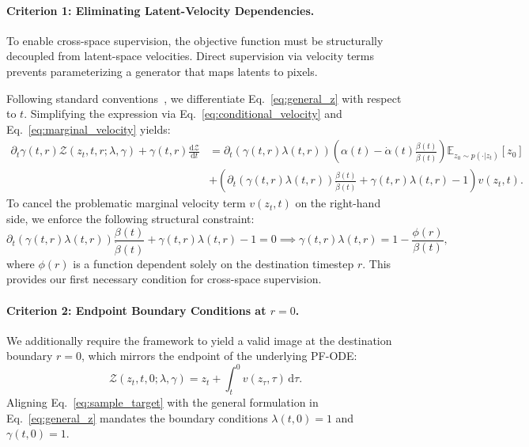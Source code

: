 \paragraph{Criterion 1: Eliminating Latent-Velocity Dependencies.}
To enable cross-space supervision, the objective function must be structurally decoupled from latent-space velocities. Direct supervision via velocity terms prevents parameterizing a generator that maps latents to pixels. 

Following standard conventions~\citep{meanflow}, we differentiate Eq.~\eqref{eq:general_z} with respect to $t$. Simplifying the expression via Eq.~\eqref{eq:conditional_velocity} and Eq.~\eqref{eq:marginal_velocity} yields:
\begin{equation}
\begin{aligned}
\partial_t\gamma(t,r)\mathcal{Z}(z_t, t, r; \lambda, \gamma) + \gamma(t,r)\frac{\mathrm{d}\mathcal{Z}}{\mathrm{d}t} 
&= \partial_t (\gamma(t, r) \lambda(t, r))\left(\alpha(t)-\dot{\alpha}(t)\frac{\beta(t)}{\dot{\beta}(t)}\right)\mathbb{E}_{z_0\sim p(\cdot | z_t)}[z_0] \\
&+\left(\partial_t (\gamma(t, r) \lambda(t, r))\frac{\beta(t)}{\dot{\beta}(t)}+\gamma(t, r) \lambda(t, r)-1\right)v(z_t,t).
\end{aligned}
\label{eq:z_derivative}
\end{equation}
To cancel the problematic marginal velocity term $v(z_t, t)$ on the right-hand side, we enforce the following structural constraint:
\begin{equation}
\partial_t(\gamma(t, r) \lambda(t, r))\frac{\beta(t)}{\dot{\beta}(t)}+\gamma(t, r) \lambda(t, r)-1 = 0 \implies \gamma(t,r)\lambda(t, r)=1-\frac{\phi(r)}{\beta(t)},
\label{eq:cancel_v}
\end{equation}
where $\phi(r)$ is a function dependent solely on the destination timestep $r$. This provides our first necessary condition for cross-space supervision.

\paragraph{Criterion 2: Endpoint Boundary Conditions at $r=0$.}
We additionally require the framework to yield a valid image at the destination boundary $r = 0$, which mirrors the endpoint of the underlying PF-ODE:
\begin{equation}
\mathcal{Z}(z_t, t, 0; \lambda, \gamma) = z_t + \int_{t}^{0} v(z_\tau, \tau)\,\mathrm{d}\tau.
\label{eq:sample_target}
\end{equation}
Aligning Eq.~\eqref{eq:sample_target} with the general formulation in Eq.~\eqref{eq:general_z} mandates the boundary conditions $\lambda(t, 0)=1$ and $\gamma(t, 0)=1$.

